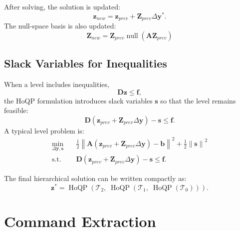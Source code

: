 \documentclass[11pt,a4paper]{article}
\newcommand{\norm}[1]{\left\| #1 \right\|}
\newcommand{\nullspace}{\operatorname{null}}
\begin{document}
After solving, the solution is updated:
\begin{equation}
	\bm{z}_{new}
	=
	\bm{z}_{prev}
	+
	\bm{Z}_{prev}\Delta\bm{y}^*.
\end{equation}
The null-space basis is also updated:
\begin{equation}
	\boxed{
		\bm{Z}_{new}
		=
		\bm{Z}_{prev}
		\nullspace(\bm{A}\bm{Z}_{prev})
	}
\end{equation}

\subsection{Slack Variables for Inequalities}

When a level includes inequalities,
\begin{equation}
	\bm{D}\bm{z}\leq\bm{f},
\end{equation}
the HoQP formulation introduces slack variables $\bm{s}$ so that the level remains feasible:
\begin{equation}
	\bm{D}
	\left(
		\bm{z}_{prev}+\bm{Z}_{prev}\Delta\bm{y}
	\right)
	-
	\bm{s}
	\leq
	\bm{f}.
\end{equation}
A typical level problem is:
\begin{equation}
	\boxed{
		\begin{aligned}
			\min_{\Delta\bm{y},\bm{s}}\quad
			&
			\frac{1}{2}
			\norm{
				\bm{A}
				(\bm{z}_{prev}+\bm{Z}_{prev}\Delta\bm{y})
				-
				\bm{b}
			}^2
			+
			\frac{1}{2}\norm{\bm{s}}^2\\
			\text{s.t.}\quad
			&
			\bm{D}
			(\bm{z}_{prev}+\bm{Z}_{prev}\Delta\bm{y})
			-
			\bm{s}
			\leq
			\bm{f}.
		\end{aligned}
	}
\end{equation}

The final hierarchical solution can be written compactly as:
\begin{equation}
	\bm{z}^{*}
	=
	\operatorname{HoQP}
	\left(
		\mathcal{T}_2,\;
		\operatorname{HoQP}
		\left(
			\mathcal{T}_1,\;
			\operatorname{HoQP}(\mathcal{T}_0)
		\right)
	\right).
\end{equation}


\section{Command Extraction}
\end{document}

